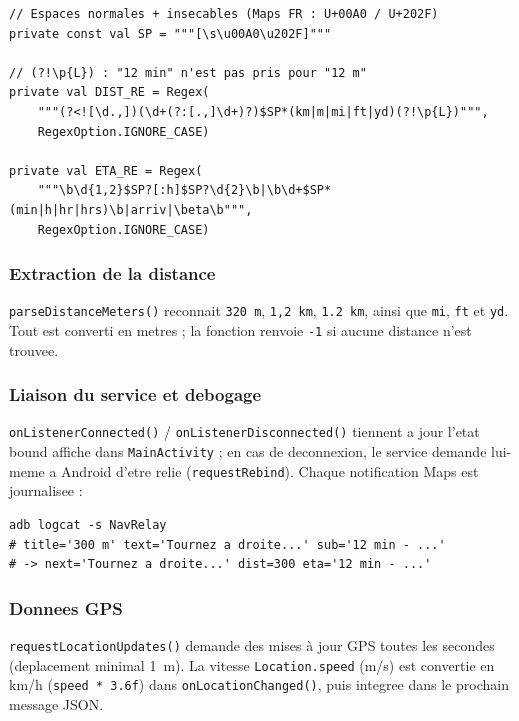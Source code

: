 \documentclass[a4paper,11pt]{article}
\begin{document}
\begin{lstlisting}[style=ktcode,caption={MapsNotificationListener.kt --- expressions regulieres}]
// Espaces normales + insecables (Maps FR : U+00A0 / U+202F)
private const val SP = """[\s\u00A0\u202F]"""

// (?!\p{L}) : "12 min" n'est pas pris pour "12 m"
private val DIST_RE = Regex(
    """(?<![\d.,])(\d+(?:[.,]\d+)?)$SP*(km|m|mi|ft|yd)(?!\p{L})""",
    RegexOption.IGNORE_CASE)

private val ETA_RE = Regex(
    """\b\d{1,2}$SP?[:h]$SP?\d{2}\b|\b\d+$SP*(min|h|hr|hrs)\b|arriv|\beta\b""",
    RegexOption.IGNORE_CASE)
\end{lstlisting}

\subsubsection{Extraction de la distance}

\texttt{parseDistanceMeters()} reconnait \og \texttt{320 m}\fg{}, \og \texttt{1,2 km}\fg{},
\og \texttt{1.2 km}\fg{}, ainsi que \texttt{mi}, \texttt{ft} et \texttt{yd}. Tout est converti
en metres ; la fonction renvoie \texttt{-1} si aucune distance n'est trouvee.

\subsubsection{Liaison du service et debogage}

\texttt{onListenerConnected()} / \texttt{onListenerDisconnected()} tiennent a jour l'etat
\og bound\fg{} affiche dans \texttt{MainActivity} ; en cas de deconnexion, le service
demande lui-meme a Android d'etre relie (\texttt{requestRebind}). Chaque notification Maps
est journalisee :

\begin{lstlisting}[style=bashcode]
adb logcat -s NavRelay
# title='300 m' text='Tournez a droite...' sub='12 min - ...'
# -> next='Tournez a droite...' dist=300 eta='12 min - ...'
\end{lstlisting}

\subsubsection{Donnees GPS}

\texttt{requestLocationUpdates()} demande des mises à jour GPS toutes les secondes
(deplacement minimal 1~m). La vitesse \texttt{Location.speed} (m/s) est convertie
en km/h (\texttt{speed * 3.6f}) dans \texttt{onLocationChanged()}, puis integree
dans le prochain message JSON.
\end{document}
